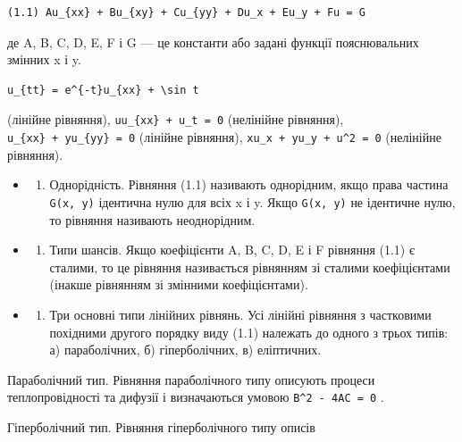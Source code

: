 \documentclass[
  ukrainian,
]{article}
\providecommand{\tightlist}{%
  \setlength{\itemsep}{0pt}\setlength{\parskip}{0pt}}
\begin{document}
\begin{verbatim}
(1.1) Au_{xx} + Bu_{xy} + Cu_{yy} + Du_x + Eu_y + Fu = G
\end{verbatim}

де A, B, C, D, E, F і G --- це константи або задані функції
пояснювальних змінних x і y.

\begin{verbatim}
u_{tt} = e^{-t}u_{xx} + \sin t
\end{verbatim}

(лінійне рівняння), \texttt{uu\_\{xx\}\ +\ u\_t\ =\ 0} (нелінійне
рівняння), \texttt{u\_\{xx\}\ +\ yu\_\{yy\}\ =\ 0} (лінійне рівняння),
\texttt{xu\_x\ +\ yu\_y\ +\ u\^{}2\ =\ 0} (нелінійне рівняння).

\begin{itemize}
\tightlist
\item
  \begin{enumerate}
  \def\labelenumi{\arabic{enumi}.}
  \setcounter{enumi}{3}
  \tightlist
  \item
    Однорідність. Рівняння (1.1) називають однорідним, якщо права
    частина \texttt{G(x,\ y)} ідентична нулю для всіх x і y. Якщо
    \texttt{G(x,\ y)} не ідентичне нулю, то рівняння називають
    неоднорідним.
  \end{enumerate}
\item
  \begin{enumerate}
  \def\labelenumi{\arabic{enumi}.}
  \setcounter{enumi}{4}
  \tightlist
  \item
    Типи шансів. Якщо коефіцієнти A, B, C, D, E і F рівняння (1.1) є
    сталими, то це рівняння називається рівнянням зі сталими
    коефіцієнтами (інакше рівнянням зі змінними коефіцієнтами).
  \end{enumerate}
\item
  \begin{enumerate}
  \def\labelenumi{\arabic{enumi}.}
  \setcounter{enumi}{5}
  \tightlist
  \item
    Три основні типи лінійних рівнянь. Усі лінійні рівняння з частковими
    похідними другого порядку виду (1.1) належать до одного з трьох
    типів: а) параболічних, б) гіперболічних, в) еліптичних.
  \end{enumerate}
\end{itemize}

Параболічний тип. Рівняння параболічного типу описують процеси
теплопровідності та дифузії і визначаються умовою
\texttt{B\^{}2\ -\ 4AC\ =\ 0} .

Гіперболічний тип. Рівняння гіперболічного типу описів
\end{document}
